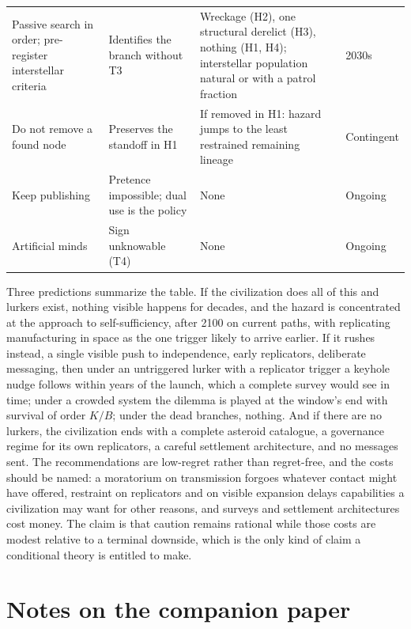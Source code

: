\documentclass[preprint,12pt]{elsarticle}
\theoremstyle{definition}
\begin{document}
\begin{table}[!htbp]
\begin{tabularx}{\textwidth}{@{}>{\raggedright\arraybackslash}p{3.1cm}>{\raggedright\arraybackslash}p{2.6cm}>{\raggedright\arraybackslash}X>{\raggedright\arraybackslash}p{1.9cm}@{}}
Passive search in order; pre-register interstellar criteria & Identifies the branch without T3 & Wreckage (H2), one structural derelict (H3), nothing (H1, H4); interstellar population natural or with a patrol fraction & 2030s \\
Do not remove a found node & Preserves the standoff in H1 & If removed in H1: hazard jumps to the least restrained remaining lineage & Contingent \\
Keep publishing & Pretence impossible; dual use is the policy & None & Ongoing \\
Artificial minds & Sign unknowable (T4) & None & Ongoing \\
\bottomrule
\end{tabularx}
\end{table}

Three predictions summarize the table. If the civilization does all of this and lurkers exist, nothing visible happens for decades, and the hazard is concentrated at the approach to self-sufficiency, after 2100 on current paths, with replicating manufacturing in space as the one trigger likely to arrive earlier. If it rushes instead, a single visible push to independence, early replicators, deliberate messaging, then under an untriggered lurker with a replicator trigger a keyhole nudge follows within years of the launch, which a complete survey would see in time; under a crowded system the dilemma is played at the window's end with survival of order $K/B$; under the dead branches, nothing. And if there are no lurkers, the civilization ends with a complete asteroid catalogue, a governance regime for its own replicators, a careful settlement architecture, and no messages sent. The recommendations are low-regret rather than regret-free, and the costs should be named: a moratorium on transmission forgoes whatever contact might have offered, restraint on replicators and on visible expansion delays capabilities a civilization may want for other reasons, and surveys and settlement architectures cost money. The claim is that caution remains rational while those costs are modest relative to a terminal downside, which is the only kind of claim a conditional theory is entitled to make.

\section{Notes on the companion paper}
\label{sec:errata}
\end{document}
